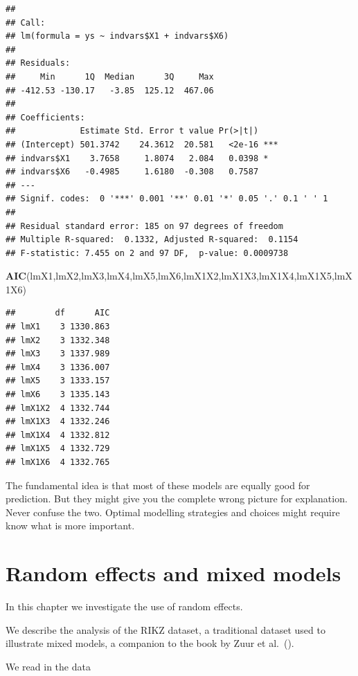 \documentclass[
]{book}
\newenvironment{Shaded}{\begin{snugshade}}{\end{snugshade}}
\newcommand{\CommentTok}[1]{\textcolor[rgb]{0.56,0.35,0.01}{\textit{#1}}}
\newcommand{\DecValTok}[1]{\textcolor[rgb]{0.00,0.00,0.81}{#1}}
\newcommand{\FunctionTok}[1]{\textcolor[rgb]{0.13,0.29,0.53}{\textbf{#1}}}
\newcommand{\NormalTok}[1]{#1}
\newcommand{\OtherTok}[1]{\textcolor[rgb]{0.56,0.35,0.01}{#1}}
\newcommand{\SpecialCharTok}[1]{\textcolor[rgb]{0.81,0.36,0.00}{\textbf{#1}}}
\newcommand{\StringTok}[1]{\textcolor[rgb]{0.31,0.60,0.02}{#1}}
\begin{document}
\begin{verbatim}
## 
## Call:
## lm(formula = ys ~ indvars$X1 + indvars$X6)
## 
## Residuals:
##     Min      1Q  Median      3Q     Max 
## -412.53 -130.17   -3.85  125.12  467.06 
## 
## Coefficients:
##             Estimate Std. Error t value Pr(>|t|)    
## (Intercept) 501.3742    24.3612  20.581   <2e-16 ***
## indvars$X1    3.7658     1.8074   2.084   0.0398 *  
## indvars$X6   -0.4985     1.6180  -0.308   0.7587    
## ---
## Signif. codes:  0 '***' 0.001 '**' 0.01 '*' 0.05 '.' 0.1 ' ' 1
## 
## Residual standard error: 185 on 97 degrees of freedom
## Multiple R-squared:  0.1332, Adjusted R-squared:  0.1154 
## F-statistic: 7.455 on 2 and 97 DF,  p-value: 0.0009738
\end{verbatim}

\begin{Shaded}
\begin{Highlighting}[]
\FunctionTok{AIC}\NormalTok{(lmX1,lmX2,lmX3,lmX4,lmX5,lmX6,lmX1X2,lmX1X3,lmX1X4,lmX1X5,lmX1X6)}
\end{Highlighting}
\end{Shaded}

\begin{verbatim}
##        df      AIC
## lmX1    3 1330.863
## lmX2    3 1332.348
## lmX3    3 1337.989
## lmX4    3 1336.007
## lmX5    3 1333.157
## lmX6    3 1335.143
## lmX1X2  4 1332.744
## lmX1X3  4 1332.246
## lmX1X4  4 1332.812
## lmX1X5  4 1332.729
## lmX1X6  4 1332.765
\end{verbatim}

The fundamental idea is that most of these models are equally good for prediction. But they might give you the complete wrong picture for explanation. Never confuse the two. Optimal modelling strategies and choices might require know what is more important.

\hypertarget{GLMM}{%
\chapter{Random effects and mixed models}\label{GLMM}}

In this chapter we investigate the use of random effects.

We describe the analysis of the RIKZ dataset, a traditional dataset used to illustrate mixed models, a companion to the book by Zuur et al.~().

We read in the data

\begin{Shaded}
\end{Shaded}
\end{document}
